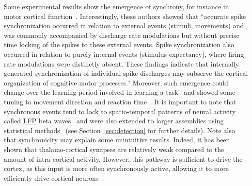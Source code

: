 \documentclass[brainsci, %
               review,submit,pdftex,moreauthors
               ]{Definitions/mdpi}
\begin{document}
Some experimental results show the emergence of synchrony, for instance in motor cortical function~\citep{riehle_spike_1997}. Interestingly, these authors showed that ``accurate spike synchronization occurred in relation to external events (stimuli, movements) and was commonly accompanied by discharge rate modulations but without precise time locking of the spikes to these external events. Spike synchronization also occurred in relation to purely internal events (stimulus expectancy), where firing rate modulations were distinctly absent. These findings indicate that internally generated synchronization of individual spike discharges may subserve the cortical organization of cognitive motor processes.'' Moreover, such emergence could change over the learning period involved in learning a task~\citep{kilavik_long-term_2009} and showed some tuning to movement direction and reaction time~\citep{grammont_spike_2003}. It is important to note that synchronous events tend to lock to spatio-temporal patterns of neural activity called \href{https://en.wikipedia.org/wiki/Local_field_potential}{LFP} beta waves~\citep{denker_lfp_2018} and were also extended to larger assemblies using statistical methods~\citep{torre_asset_2016} (see Section~\ref{sec:detection} for further details). Note also that synchronicity may explain some unintuitive results. Indeed, it has been shown that thalamo-cortical synapses are relatively weak compared to the amount of intra-cortical activity. However, this pathway is sufficient to drive the cortex, as this input is more often synchronously active, allowing it to more efficiently drive cortical neurons~\citep{bruno_cortex_2006}. 
\end{document}
